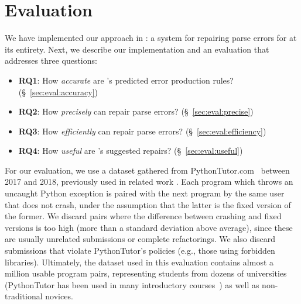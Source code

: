 \section{Evaluation}
\label{sec:eval}

We have implemented our approach in \toolname: a system for
repairing parse errors for \python at its entirety. Next,
we describe our implementation and an evaluation that addresses three
questions:

\begin{itemize}
    \item \textbf{RQ1}: How \emph{accurate} are \toolname's predicted error production rules?
                        (\S~\ref{sec:eval:accuracy})
    \item \textbf{RQ2}: How \emph{precisely} can \toolname repair parse errors?
                        (\S~\ref{sec:eval:precise})
    \item \textbf{RQ3}: How \emph{efficiently} can \toolname repair parse errors?
                        (\S~\ref{sec:eval:efficiency})
    \item \textbf{RQ4}: How \emph{useful} are \toolname's suggested repairs?
                        (\S~\ref{sec:eval:useful})

\end{itemize}


%
For our evaluation, we use a \python dataset gathered from
PythonTutor.com~\citep{Guo2013} between 2017 and 2018, previously used in
related work \citep{Endres2019,Cosman2020}. Each program which throws an
uncaught Python exception is paired with the next program by the same user that
does not crash, under the assumption that the latter is the fixed version of the
former. We discard pairs where the difference between crashing and fixed
versions is too high (more than a standard deviation above average), since these
are usually unrelated submissions or complete refactorings. We also discard
submissions that violate PythonTutor's policies (e.g., those using forbidden
libraries). Ultimately, the dataset used in this evaluation contains almost a
million usable program pairs, representing students from dozens of universities
(PythonTutor has been used in many introductory courses~\citep{Guo2013}) as well
as non-traditional novices.

